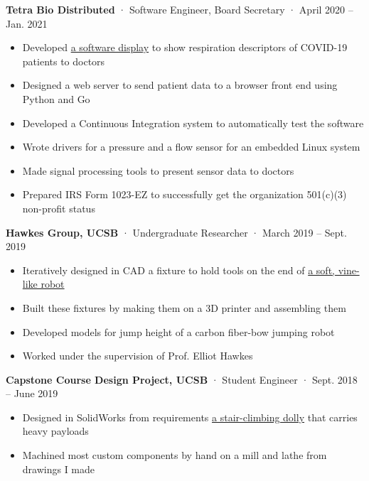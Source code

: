 \documentclass[12pt, oneside]{article}
\newcommand{\jobtitle}[3] {
	{\bf #1} · {#2} · {#3} \vspace{-7pt} \\
}
\begin{document}
\begin{flushleft}
\jobtitle{Tetra Bio Distributed}{Software Engineer, Board Secretary}{April 2020 – Jan. 2021}
\begin{itemize}
	\item Developed \href{https://github.com/tetrabiodistributed/project-tetra-display}{a software display} to show respiration descriptors of COVID-19 patients to doctors \\
	\item Designed a web server to send patient data to a browser front end using Python and Go \\
	\item Developed a Continuous Integration system to automatically test the software \\
	\item Wrote drivers for a pressure and a flow sensor for an embedded Linux system \\
	\item Made signal processing tools to present sensor data to doctors \\
	\item Prepared IRS Form 1023-EZ to successfully get the organization 501(c)(3) non-profit status \\
\end{itemize}

\jobtitle{Hawkes Group, UCSB}{Undergraduate Researcher}{March 2019 – Sept. 2019}
\begin{itemize}
  \item Iteratively designed in CAD a fixture to hold tools on the end of \href{https://blog.fletcherporter.com/blog/vine-robots/}{a soft, vine-like robot} \\
  \item Built these fixtures by making them on a 3D printer and assembling them \\
  \item Developed models for jump height of a carbon fiber-bow jumping robot \\
  \item Worked under the supervision of Prof. Elliot Hawkes \\
\end{itemize}

\jobtitle{Capstone Course Design Project, UCSB}{Student Engineer}{Sept. 2018 – June 2019}
\begin{itemize}
	\item Designed in SolidWorks from requirements \href{https://blog.fletcherporter.com/blog/stair-climbing-dolly/}{a stair-climbing dolly} that carries heavy payloads \\
	\item Machined most custom components by hand on a mill and lathe from drawings I made \\
\end{itemize}


\end{flushleft}
\end{document}
